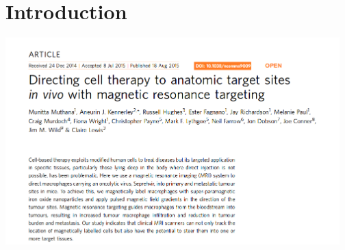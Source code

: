 \documentclass[8pt,xcolor=table]{beamer}
\begin{document}
% 
% 
% 
% 
% 






\newcommand{\pcaLongFigs}{../PCA_long_paper/figures}



\section{Introduction}


\begin{frame}
 
\includegraphics[height=8cm]{cover}
 
\end{frame}
\end{document}
